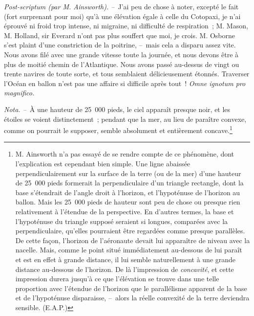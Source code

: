 \documentclass[french,twoside]{book} %
\begin{document}
\emph{Post-scriptum (par M. Ainsworth). –} J’ai peu de chose à noter, excepté le fait (fort surprenant pour moi) qu’à une élévation égale à celle du Cotopaxi, je n’ai éprouvé ni froid trop intense, ni migraine, ni difficulté de respiration ; M. Mason, M. Holland, sir Everard n’ont pas plus souffert que moi, je crois. M. Osborne s’est plaint d’une constriction de la poitrine, – mais cela a disparu assez vite. Nous avons filé avec une grande vitesse toute la journée, et nous devons être à plus de moitié chemin de l’Atlantique. Nous avons passé au-dessus de vingt ou trente navires de toute sorte, et tous semblaient délicieusement étonnés. Traverser l’Océan en ballon n’est pas une affaire si difficile après tout ! \emph{Omne ignotum pro magnifico.}\par
\emph{Nota. –} À une hauteur de 25 000 pieds, le ciel apparaît presque noir, et les étoiles se voient distinctement ; pendant que la mer, au lieu de paraître convexe, comme on pourrait le supposer, semble absolument et entièrement concave.\footnote{M. Ainsworth n’a pas essayé de se rendre compte de ce phénomène, dont l’explication est cependant bien simple. Une ligne abaissée perpendiculairement sur la surface de la terre (ou de la mer) d’une hauteur de 25 000 pieds formerait la perpendiculaire d’un triangle rectangle, dont la base s’étendrait de l’angle droit à l’horizon, et l’hypoténuse de l’horizon au ballon. Mais les 25 000 pieds de hauteur sont peu de chose ou presque rien relativement à l’étendue de la perspective. En d’autres termes, la base et l’hypoténuse du triangle supposé seraient si longues, comparées avec la perpendiculaire, qu’elles pourraient être regardées comme presque parallèles. De cette façon, l’horizon de l’aéronaute devait lui apparaître de niveau avec la nacelle. Mais, comme le point situé immédiatement au-dessous de lui paraît et est en effet à grande distance, il lui semble naturellement à une grande distance au-dessous de l’horizon. De là l’impression de \emph{concavité}, et cette impression durera jusqu’à ce que l’élévation se trouve dans une telle proportion avec l’étendue de l’horizon que le parallélisme apparent de la base et de l’hypoténuse disparaisse, – alors la réelle convexité de la terre deviendra sensible. (E.A.P.)}\par
\end{document}

